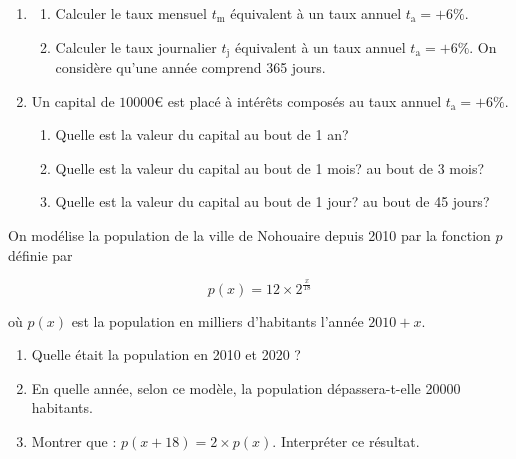 \documentclass[french]{book}
\begin{document}
\begin{exocor}
\begin{enumerate}
\item 
\begin{enumerate}
\item Calculer le taux mensuel $t_{\mathrm{m}}$ équivalent à un taux annuel $t_{\mathrm{a}}=+6 \%$.

\item Calculer le taux journalier $t_{\mathrm{j}}$ équivalent à un taux annuel $t_{\mathrm{a}}=+6 \%$. On considère qu'une année comprend 365 jours.
\end{enumerate}

\item Un capital de $10000 €$ est placé à intérêts composés au taux annuel $t_{\mathrm{a}}=+6 \%$.

\begin{enumerate}
\item Quelle est la valeur du capital au bout de 1 an?

\item Quelle est la valeur du capital au bout de 1 mois? au bout de 3 mois?

\item Quelle est la valeur du capital au bout de 1 jour? au bout de 45 jours? 
\end{enumerate}
\end{enumerate}
\end{exocor}



\begin{exocor}
On modélise la population de la ville de Nohouaire depuis 2010 par la fonction $p$ définie par

$$
p(x)=12 \times 2^{\frac{x}{18}}
$$

où $p(x)$ est la population en milliers d'habitants l'année $2010+x$.

\begin{enumerate}
\item Quelle était la population en 2010 et 2020 ?

\item En quelle année, selon ce modèle, la population dépassera-t-elle 20000 habitants.

\item Montrer que : $p(x+18)=2 \times p(x)$. Interpréter ce résultat.

\end{enumerate}
\end{exocor}
\end{document}
